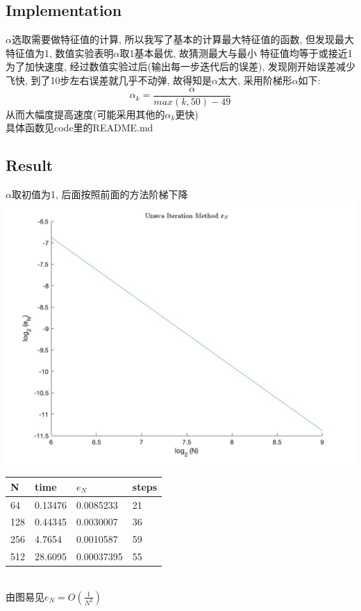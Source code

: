 \documentclass{article}
\begin{document}
\subsection{Implementation}
$\alpha$选取需要做特征值的计算, 所以我写了基本的计算最大特征值的函数, 
但发现最大特征值为1, 数值实验表明$\alpha$取1基本最优, 故猜测最大与最小
特征值均等于或接近1\\
为了加快速度, 经过数值实验过后(输出每一步迭代后的误差), 发现刚开始误差减少飞快, 
到了10步左右误差就几乎不动弹, 故得知是$\alpha$太大, 采用阶梯形$\alpha$如下:
$$
\alpha_k = \frac{\alpha}{max(k,50)-49}
$$
从而大幅度提高速度(可能采用其他的$\alpha_k$更快)\\
具体函数见code里的README.md\\
\subsection{Result}
$\alpha$取初值为1, 后面按照前面的方法阶梯下降\\
\includegraphics[scale=0.3]{image/UIM.jpg}\\
\begin{tabular}{llll}
N & time & $e_N$ & steps \\ 
\hline 
64 & 0.13476 & 0.0085233 & 21 \\ 
128 & 0.44345 & 0.0030007 & 36 \\ 
256 & 4.7654 & 0.0010587 & 59 \\ 
512 & 28.6095 & 0.00037395 & 55 \\ 
\hline 
\end{tabular}\\
由图易见$e_N=O(\frac{1}{N^2})$
\end{document}
